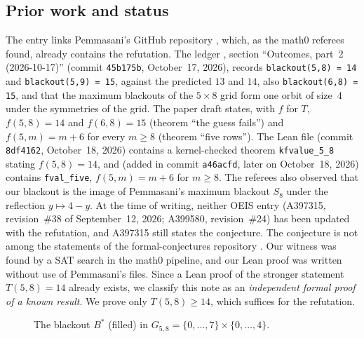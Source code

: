\documentclass[11pt]{amsart}
\theoremstyle{plain}
\theoremstyle{definition}
\newcommand{\Bs}{B^{*}}
\begin{document}
\subsection*{Prior work and status}
The entry links Pemmasani's GitHub repository \cite{Pem}, which, as the math0 referees found, already contains the refutation. The ledger , section ``Outcomes, part~2 (2026-10-17)'' (commit \texttt{45b175b}, October~17, 2026), records \texttt{blackout(5,8) = 14} and \texttt{blackout(5,9) = 15}, against the predicted $13$ and $14$, also \texttt{blackout(6,8) = 15}, and that the maximum blackouts of the $5\times8$ grid form one orbit of size~$4$ under the symmetries of the grid. The paper draft  states, with $f$ for $T$, $f(5,8)=14$ and $f(6,8)=15$ (theorem ``the guess fails'') and $f(5,m)=m+6$ for every $m\ge8$ (theorem ``five rows''). The Lean file  (commit \texttt{8df4162}, October~18, 2026) contains a kernel-checked theorem \texttt{kfvalue\_5\_8} stating $f(5,8)=14$, and  (added in commit \texttt{a46acfd}, later on October~18, 2026) contains \texttt{fval\_five}, $f(5,m)=m+6$ for $m\ge8$. The referees also observed that our blackout is the image of Pemmasani's maximum blackout $S_8$ under the reflection $y\mapsto4-y$. At the time of writing, neither OEIS entry (A397315, revision~\#38 of September~12, 2026; A399580, revision~\#24) has been updated with the refutation, and A397315 still states the conjecture. The conjecture is not among the statements of the formal-conjectures repository \cite{FC}.
Our witness was found by a SAT search in the math0 pipeline, and our Lean proof was written without use of Pemmasani's files. Since a Lean proof of the stronger statement $T(5,8)=14$ already exists, we classify this note as an \emph{independent formal proof of a known result}. We prove only $T(5,8)\ge14$, which suffices for the refutation.

\begin{figure}[ht]
\centering
{}
\caption{The blackout $\Bs$ (filled) in $G_{5,8}=\{0,\dots,7\}\times\{0,\dots,4\}$.}\label{fig:witness}
\end{figure}
\end{document}
